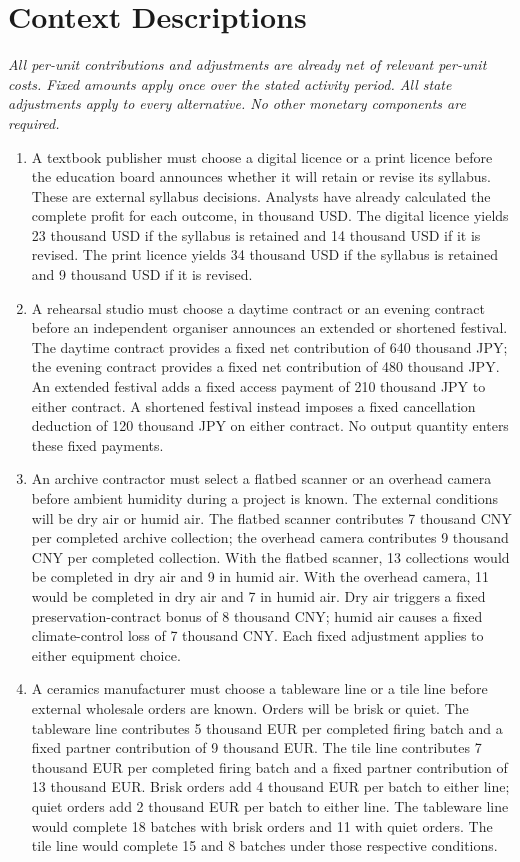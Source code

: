 \section*{Context Descriptions}
\vspace{-3mm}
\textit{All per-unit contributions and adjustments are already net of relevant per-unit costs. Fixed amounts apply once over the stated activity period. All state adjustments apply to every alternative. No other monetary components are required.}
\begin{enumerate}[leftmargin=0.22in]
\item
A textbook publisher must choose a digital licence or a print licence before the education board announces whether it will retain or revise its syllabus. These are external syllabus decisions. Analysts have already calculated the complete profit for each outcome, in thousand USD. The digital licence yields 23 thousand USD if the syllabus is retained and 14 thousand USD if it is revised. The print licence yields 34 thousand USD if the syllabus is retained and 9 thousand USD if it is revised.

\item
A rehearsal studio must choose a daytime contract or an evening contract before an independent organiser announces an extended or shortened festival. The daytime contract provides a fixed net contribution of 640 thousand JPY; the evening contract provides a fixed net contribution of 480 thousand JPY. An extended festival adds a fixed access payment of 210 thousand JPY to either contract. A shortened festival instead imposes a fixed cancellation deduction of 120 thousand JPY on either contract. No output quantity enters these fixed payments.

\item
An archive contractor must select a flatbed scanner or an overhead camera before ambient humidity during a project is known. The external conditions will be dry air or humid air. The flatbed scanner contributes 7 thousand CNY per completed archive collection; the overhead camera contributes 9 thousand CNY per completed collection. With the flatbed scanner, 13 collections would be completed in dry air and 9 in humid air. With the overhead camera, 11 would be completed in dry air and 7 in humid air. Dry air triggers a fixed preservation-contract bonus of 8 thousand CNY; humid air causes a fixed climate-control loss of 7 thousand CNY. Each fixed adjustment applies to either equipment choice.

\item
A ceramics manufacturer must choose a tableware line or a tile line before external wholesale orders are known. Orders will be brisk or quiet. The tableware line contributes 5 thousand EUR per completed firing batch and a fixed partner contribution of 9 thousand EUR. The tile line contributes 7 thousand EUR per completed firing batch and a fixed partner contribution of 13 thousand EUR. Brisk orders add 4 thousand EUR per batch to either line; quiet orders add 2 thousand EUR per batch to either line. The tableware line would complete 18 batches with brisk orders and 11 with quiet orders. The tile line would complete 15 and 8 batches under those respective conditions.


\end{enumerate}

